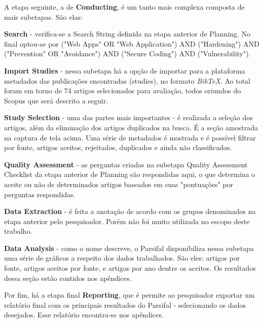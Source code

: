 A etapa seguinte, a de \textbf{Conducting}, é um tanto mais complexa composta de mais subetapas. São elas:
\begin{alineas}
\item \textbf{Search} - verifica-se a Search String definida na etapa anterior de Planning. No final optou-se por ("Web Apps" OR "Web Application") AND ("Hardening") AND ("Prevention" OR "Avoidance") AND ("Secure Coding") AND ("Vulnerability").

\item \textbf{Import Studies} - nessa subetapa há a opção de importar para a plataforma metadados das publicações encontradas (studies), no formato \textit{BibTeX}. Ao total foram em torno de 74 artigos selecionados para avaliação, todos oriundos do Scopus que será descrito a seguir.

\item \textbf{Study Selection} - uma das partes mais importantes - é realizada a seleção dos artigos, além da eliminação dos artigos duplicados na busca. É a seção amostrada na captura de tela acima. Uma série de metadados é mostrada e é possível filtrar por fonte, artigos aceitos, rejeitados, duplicados e ainda não classificados.

\item \textbf{Quality Assessment} - as perguntas criadas na subetapa Quality Assessment Checklist da etapa anterior de Planning são respondidas aqui, o que determina o aceite ou não de determinados artigos baseados em suas "pontuações" por perguntas respondidas.

\item \textbf{Data Extraction} - é feita a anotação de acordo com os grupos denominados na etapa anterior pelo pesquisador. Porém não foi muito utilizada no escopo deste trabalho.

\item \textbf{Data Analysis} - como o nome descreve, o Parsifal disponibiliza nessa subetapa uma série de gráficos a respeito dos dados trabalhados. São eles: artigos por fonte, artigos aceitos por fonte, e artigos por ano dentre os aceitos. Os resultados dessa seção estão contidos nos apêndices.

\end{alineas}

Por fim, há a etapa final \textbf{Reporting}, que é permite ao pesquisador exportar um relatório final com os principais resultados do Parsifal - selecionando os dados desejados. Esse relatório encontra-se nos apêndices.

